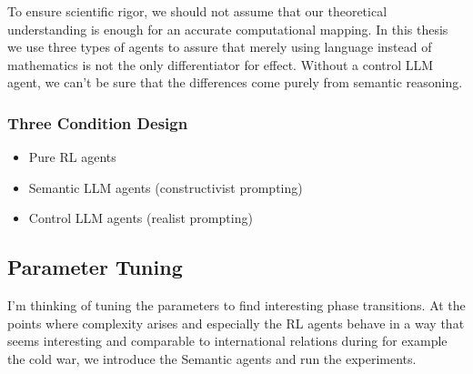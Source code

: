 To ensure scientific rigor, we should not assume that our theoretical understanding is enough for an accurate computational mapping. In this thesis we use three types of agents to assure that merely using language instead of mathematics is not the only differentiator for effect. Without a control LLM agent, we can't be sure that the differences come purely from semantic reasoning.

\subsubsection{Three Condition Design}

\begin{itemize}
    \item Pure RL agents
    \item Semantic LLM agents (constructivist prompting)
    \item Control LLM agents (realist prompting)
\end{itemize}


\subsection{Parameter Tuning}

I'm thinking of tuning the parameters to find interesting phase transitions. At the points where complexity arises and especially the RL agents behave in a way that seems interesting and comparable to international relations during for example the cold war, we introduce the Semantic agents and run the experiments.

